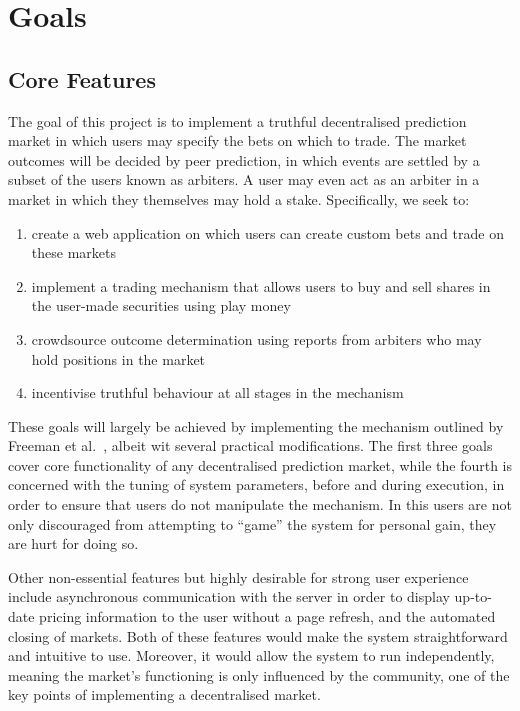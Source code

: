 \section{Goals}

\label{sec:goals}

\subsection{Core Features}

The goal of this project is to implement a truthful decentralised prediction
market in which users may specify the bets on which to trade. The market
outcomes will be decided by peer prediction, in which events are settled by a
subset of the users known as arbiters. A user may even act as an arbiter in a
market in which they themselves may hold a stake. Specifically, we seek to:

\begin{enumerate}
		\label{enm:goals}
	\item create a web application on which users can create custom bets and
		trade on these markets 
	\item implement a trading mechanism that allows users to buy and sell
		shares in the user-made securities using play money
	\item crowdsource outcome determination using reports from arbiters who may
		hold positions in the market
	\item incentivise truthful behaviour at all stages in the mechanism
\end{enumerate}

These goals will largely be achieved by implementing the mechanism outlined by
Freeman et al.~\cite{Freeman2017}, albeit wit several practical modifications.
The first three goals cover core functionality of any decentralised prediction
market, while the fourth is concerned with the tuning of system parameters,
before and during execution, in order to ensure that users do not manipulate
the mechanism. In this users are not only discouraged from attempting to
``game'' the system for personal gain, they are hurt for doing so.

Other non-essential features but highly desirable for strong user experience
include asynchronous communication with the server in order to display
up-to-date pricing information to the user without a page refresh, and the
automated closing of markets. Both of these features would make the system
straightforward and intuitive to use. Moreover, it would allow the system to
run independently, meaning the market's functioning is only influenced by the
community, one of the key points of implementing a decentralised market.


